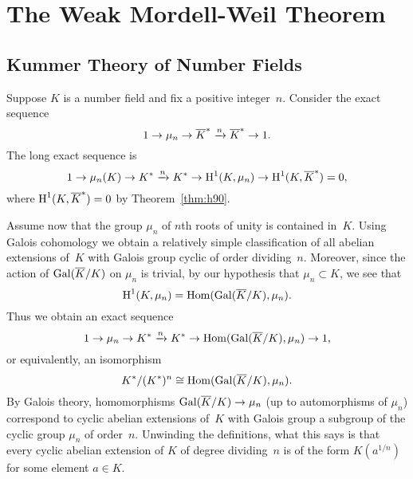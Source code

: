 \chapter{The Weak Mordell-Weil Theorem}\label{ch:weakmw}

\section{Kummer Theory of Number Fields}\label{sec:kummernf}

Suppose $K$ is a number field and fix a positive integer~$n$.
Consider the exact sequence
$$
	1 \to \mu_n \to \overline{K}^* \xrightarrow{n} \overline{K}^* \to 1.
$$
The long exact sequence is
$$
	1 \to \mu_n(K) \to K^* \xrightarrow{n} K^* \to \operatorname{H}^1(K,\mu_n) \to \operatorname{H}^1(K,\overline{K}^*) =0,
$$
where $\operatorname{H}^1(K,\overline{K}^*)=0$ by Theorem~\ref{thm:h90}.

Assume now that the group $\mu_n$ of $n$th roots of unity is
contained in~$K$. Using Galois cohomology we obtain a relatively
simple classification of all abelian extensions of~$K$ with
Galois group cyclic of order dividing~$n$.  Moreover, since the
action of $\operatorname{Gal}(\overline{K}/K)$ on $\mu_n$ is trivial, by our hypothesis
that $\mu_n\subset K$, we see that
$$
	\operatorname{H}^1(K,\mu_n) = \operatorname{Hom}(\operatorname{Gal}(\overline{K}/K),\mu_n).
$$
Thus we obtain an exact sequence
$$
	1 \to \mu_n \to K^* \xrightarrow{n} K^* \to \operatorname{Hom}(\operatorname{Gal}(\overline{K}/K),\mu_n) \to 1,
$$
or equivalently, an isomorphism
$$
	K^*/(K^*)^n \cong \operatorname{Hom}(\operatorname{Gal}(\overline{K}/K),\mu_n).
$$
By Galois theory, homomorphisms $\operatorname{Gal}(\overline{K}/K)\to \mu_n$ (up to
automorphisms of $\mu_n$) correspond to cyclic abelian extensions
of~$K$ with Galois group a subgroup of the cyclic group $\mu_n$ of
order~$n$.  Unwinding the definitions, what this says is that every
cyclic abelian extension of $K$ of degree dividing~$n$ is of the form
$K(a^{1/n})$ for some element $a\in K$.

